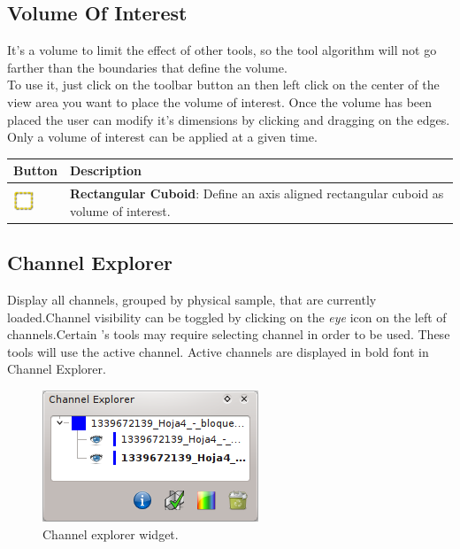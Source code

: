\subsection{Volume Of Interest}

It's a volume to limit the effect of other tools, so the tool algorithm will not
go farther than the boundaries that define the volume.\\

To use it, just click on the toolbar button an then left click on the center of
the view area you want to place the volume of interest. Once the volume has been
placed the user can modify it's dimensions by clicking and dragging on the edges.\\

Only a volume of interest can be applied at a given time.\\

\vspace{0.3cm}
\begin{tabular}{| m{1.3cm} | m{12cm} |}
\hline
\textbf{Button} & \textbf{Description}\\
\hline
\includegraphics[width=0.6cm]{../../frontend/toolbar/voi/rsc/roi} &
\textbf{Rectangular Cuboid}: Define an axis aligned rectangular cuboid as volume
of interest.\\
\hline
\end{tabular}

\subsection{Channel Explorer}
Display all channels, grouped by physical sample, that are currently
loaded.Channel visibility can be toggled by clicking on the \textit{eye} icon on
the left of channels.Certain \espina's tools may require selecting channel in
order to be used. These tools will use the active channel. Active channels are
displayed in bold font in Channel Explorer.

\begin{figure}[H]
\centering
\includegraphics{fig/ChannelExplorer}
\caption{Channel explorer widget.}
\end{figure}

